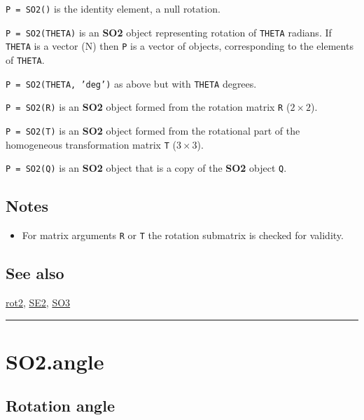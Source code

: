 \texttt{P = SO2()} is the identity element, a null rotation.



\texttt{P = SO2(THETA)} is an \textbf{\color{red} SO2} object representing rotation of \texttt{THETA} radians.
If \texttt{THETA} is a vector (N) then \texttt{P} is a vector of objects, corresponding to
the elements of \texttt{THETA}.



\texttt{P = SO2(THETA, 'deg')} as above but with \texttt{THETA} degrees.



\texttt{P = SO2(R)} is an \textbf{\color{red} SO2} object formed from the rotation
matrix \texttt{R} ($2 \times 2$).



\texttt{P = SO2(T)} is an \textbf{\color{red} SO2} object formed from the rotational part
of the homogeneous transformation matrix \texttt{T} ($3 \times 3$).



\texttt{P = SO2(Q)} is an \textbf{\color{red} SO2} object that is a copy of the \textbf{\color{red} SO2} object \texttt{Q}.


\subsection*{Notes}
\begin{itemize}
  \item For matrix arguments \texttt{R} or \texttt{T} the rotation submatrix is checked for validity.
\end{itemize}

\subsection*{See also}


\hyperlink{rot2}{\color{blue} rot2}, \hyperlink{SE2}{\color{blue} SE2}, \hyperlink{SO3}{\color{blue} SO3}

\vspace{1.5ex}\hrule

\hypertarget{SO2.angle}{\section*{SO2.angle}}
\subsection*{Rotation angle}


